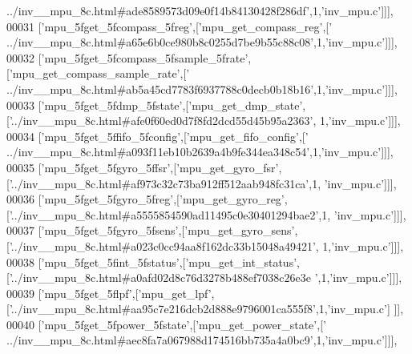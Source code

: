 \begin{DoxyCode}
{      ../inv\_\_mpu\_8c.html#ade8589573d09e0f14b84130428f286df'},1,\textcolor{stringliteral}{'inv\_mpu.c'}]]],
00031   [\textcolor{stringliteral}{'mpu\_5fget\_5fcompass\_5freg'},[\textcolor{stringliteral}{'mpu\_get\_compass\_reg'},[\textcolor{stringliteral}{'
      ../inv\_\_mpu\_8c.html#a65e6b0ce980b8c0255d7be9b55c88c08'},1,\textcolor{stringliteral}{'inv\_mpu.c'}]]],
00032   [\textcolor{stringliteral}{'mpu\_5fget\_5fcompass\_5fsample\_5frate'},[\textcolor{stringliteral}{'mpu\_get\_compass\_sample\_rate'},[\textcolor{stringliteral}{'
      ../inv\_\_mpu\_8c.html#ab5a45cd7783f6937788c0decb0b18b16'},1,\textcolor{stringliteral}{'inv\_mpu.c'}]]],
00033   [\textcolor{stringliteral}{'mpu\_5fget\_5fdmp\_5fstate'},[\textcolor{stringliteral}{'mpu\_get\_dmp\_state'},[\textcolor{stringliteral}{'../inv\_\_mpu\_8c.html#afe0f60ed0d7f8fd2dcd55d45b95a2363'},
      1,\textcolor{stringliteral}{'inv\_mpu.c'}]]],
00034   [\textcolor{stringliteral}{'mpu\_5fget\_5ffifo\_5fconfig'},[\textcolor{stringliteral}{'mpu\_get\_fifo\_config'},[\textcolor{stringliteral}{'
      ../inv\_\_mpu\_8c.html#a093f11eb10b2639a4b9fe344ea348c54'},1,\textcolor{stringliteral}{'inv\_mpu.c'}]]],
00035   [\textcolor{stringliteral}{'mpu\_5fget\_5fgyro\_5ffsr'},[\textcolor{stringliteral}{'mpu\_get\_gyro\_fsr'},[\textcolor{stringliteral}{'../inv\_\_mpu\_8c.html#af973c32c73ba912ff512aab948fc31ca'},1,\textcolor{stringliteral}{
      'inv\_mpu.c'}]]],
00036   [\textcolor{stringliteral}{'mpu\_5fget\_5fgyro\_5freg'},[\textcolor{stringliteral}{'mpu\_get\_gyro\_reg'},[\textcolor{stringliteral}{'../inv\_\_mpu\_8c.html#a5555854590ad11495c0e30401294bae2'},1,\textcolor{stringliteral}{
      'inv\_mpu.c'}]]],
00037   [\textcolor{stringliteral}{'mpu\_5fget\_5fgyro\_5fsens'},[\textcolor{stringliteral}{'mpu\_get\_gyro\_sens'},[\textcolor{stringliteral}{'../inv\_\_mpu\_8c.html#a023c0cc94aa8f162dc33b15048a49421'},
      1,\textcolor{stringliteral}{'inv\_mpu.c'}]]],
00038   [\textcolor{stringliteral}{'mpu\_5fget\_5fint\_5fstatus'},[\textcolor{stringliteral}{'mpu\_get\_int\_status'},[\textcolor{stringliteral}{'../inv\_\_mpu\_8c.html#a0afd02d8c76d3278b488ef7038c26e3e
      '},1,\textcolor{stringliteral}{'inv\_mpu.c'}]]],
00039   [\textcolor{stringliteral}{'mpu\_5fget\_5flpf'},[\textcolor{stringliteral}{'mpu\_get\_lpf'},[\textcolor{stringliteral}{'../inv\_\_mpu\_8c.html#aa95c7e216dcb2d888e9796001ca555f8'},1,\textcolor{stringliteral}{'inv\_mpu.c'}]
      ]],
00040   [\textcolor{stringliteral}{'mpu\_5fget\_5fpower\_5fstate'},[\textcolor{stringliteral}{'mpu\_get\_power\_state'},[\textcolor{stringliteral}{'
      ../inv\_\_mpu\_8c.html#aec8fa7a067988d174516bb735a4a0bc9'},1,\textcolor{stringliteral}{'inv\_mpu.c'}]]],

\end{DoxyCode}
